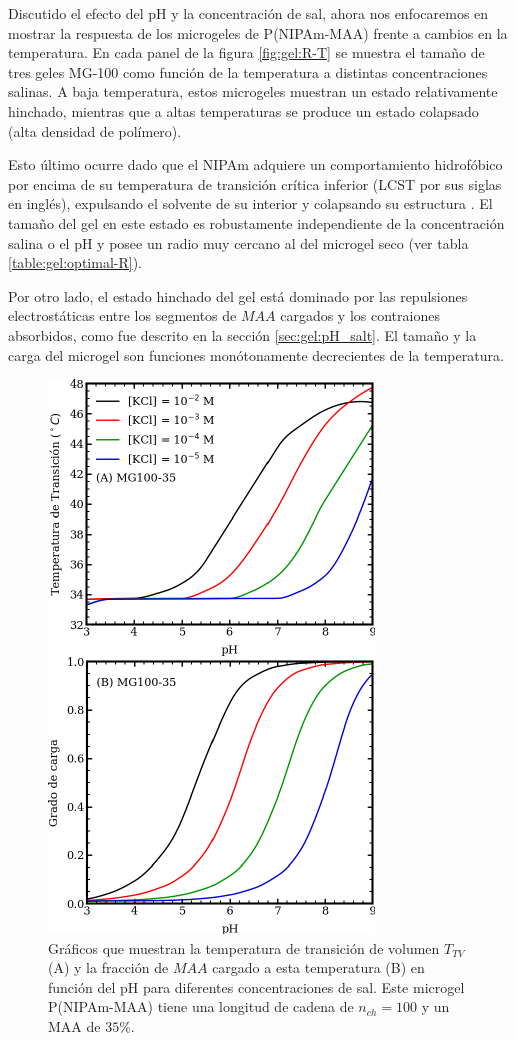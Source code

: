 Discutido el efecto del pH y la concentraci\'on de sal, ahora nos enfocaremos en mostrar la respuesta de los microgeles de P(NIPAm-MAA) frente a cambios en la temperatura.
En cada panel de la figura \ref{fig:gel:R-T} se muestra el tama\~no de tres geles MG-100 como funci\'on de la temperatura a distintas concentraciones salinas.
A baja temperatura, estos microgeles muestran un estado relativamente hinchado, mientras que a altas temperaturas se produce un estado colapsado (alta densidad de pol\'imero).

Esto \'ultimo ocurre dado que el NIPAm adquiere un comportamiento hidrof\'obico por encima de su temperatura de transici\'on cr\'itica inferior (LCST por sus siglas en ingl\'es), expulsando el solvente de su interior y colapsando su estructura \cite{sbeih2019structural}.
El tama\~no del gel en este estado es robustamente independiente de la concentraci\'on salina o el pH y posee un radio muy cercano al del microgel seco (ver tabla \ref{table:gel:optimal-R}).

Por otro lado, el estado hinchado del gel est\'a dominado por las repulsiones electrost\'aticas entre los segmentos de $MAA$ cargados y los contraiones absorbidos, como fue descrito en la secci\'on \ref{sec:gel:pH_salt}.
El tama\~no y la carga del microgel son funciones mon\'otonamente decrecientes de la temperatura.


\begin{figure}[!htb]
	\centering
	\includegraphics[width=0.5\linewidth]{Figures/graph-gel/Tpt-pH.pdf}
	\caption{Gr\'aficos que muestran la temperatura de transici\'on de volumen $T_{TV}$ (A) y la fracci\'on de $MAA$ cargado a esta temperatura (B) en funci\'on del pH para diferentes concentraciones de sal.
		Este microgel P(NIPAm-MAA) tiene una longitud de cadena de $n_{ch}=100$ y un MAA de $35\%$.}
	\label{fig:gel:Tpt-pH}
\end{figure}


